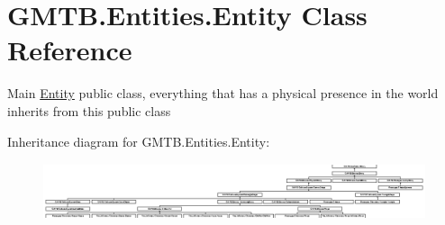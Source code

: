 \hypertarget{class_g_m_t_b_1_1_entities_1_1_entity}{}\section{G\+M\+T\+B.\+Entities.\+Entity Class Reference}
\label{class_g_m_t_b_1_1_entities_1_1_entity}


Main \mbox{\hyperlink{class_g_m_t_b_1_1_entities_1_1_entity}{Entity}} public class, everything that has a physical presence in the world inherits from this public class  


Inheritance diagram for G\+M\+T\+B.\+Entities.\+Entity\+:\begin{figure}[H]
\begin{center}
\leavevmode
\includegraphics[height=1.676020cm]{class_g_m_t_b_1_1_entities_1_1_entity}
\end{center}
\end{figure}
